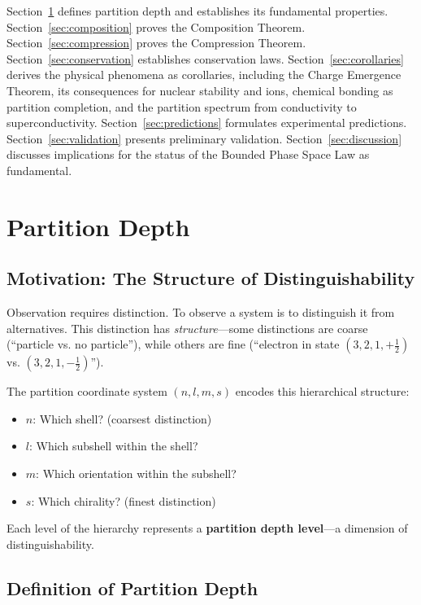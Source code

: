 \documentclass[twocolumn,10pt,a4paper]{article}
\theoremstyle{definition}
\theoremstyle{remark}
\begin{document}
Section~\ref{sec:depth} defines partition depth and establishes its fundamental properties. Section~\ref{sec:composition} proves the Composition Theorem. Section~\ref{sec:compression} proves the Compression Theorem. Section~\ref{sec:conservation} establishes conservation laws. Section~\ref{sec:corollaries} derives the physical phenomena as corollaries, including the Charge Emergence Theorem, its consequences for nuclear stability and ions, chemical bonding as partition completion, and the partition spectrum from conductivity to superconductivity. Section~\ref{sec:predictions} formulates experimental predictions. Section~\ref{sec:validation} presents preliminary validation. Section~\ref{sec:discussion} discusses implications for the status of the Bounded Phase Space Law as fundamental.

\section{Partition Depth}
\label{sec:depth}

\subsection{Motivation: The Structure of Distinguishability}

Observation requires distinction. To observe a system is to distinguish it from alternatives. This distinction has \emph{structure}---some distinctions are coarse (``particle vs. no particle''), while others are fine (``electron in state $(3, 2, 1, +\frac{1}{2})$ vs. $(3, 2, 1, -\frac{1}{2})$'').

The partition coordinate system $(n, l, m, s)$ encodes this hierarchical structure:
\begin{itemize}
    \item $n$: Which shell? (coarsest distinction)
    \item $l$: Which subshell within the shell?
    \item $m$: Which orientation within the subshell?
    \item $s$: Which chirality? (finest distinction)
\end{itemize}

Each level of the hierarchy represents a \textbf{partition depth level}---a dimension of distinguishability.

\subsection{Definition of Partition Depth}
\end{document}

